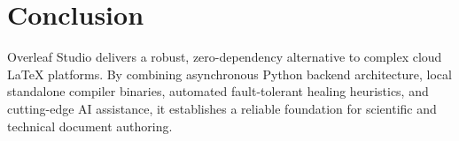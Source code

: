 \documentclass[11pt,a4paper]{article}
\begin{document}
\section{Conclusion}

Overleaf Studio delivers a robust, zero-dependency alternative to complex cloud LaTeX platforms. By combining asynchronous Python backend architecture, local standalone compiler binaries, automated fault-tolerant healing heuristics, and cutting-edge AI assistance, it establishes a reliable foundation for scientific and technical document authoring.
\end{document}
